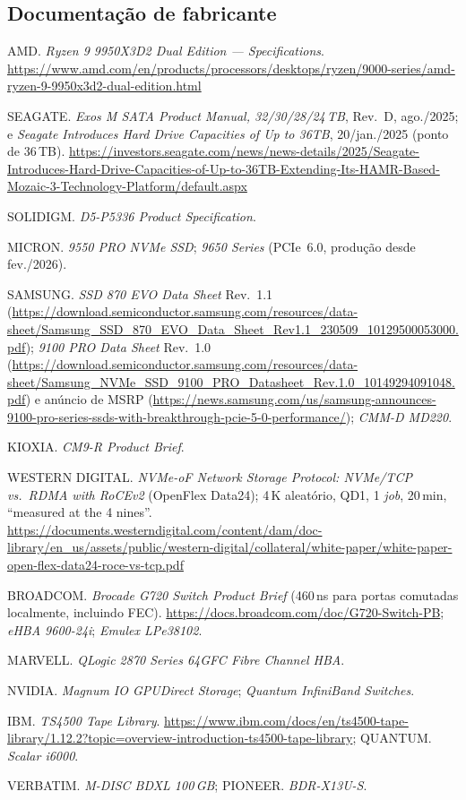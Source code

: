 \documentclass[11pt,a4paper]{article}
\begin{document}
\subsection*{Documentação de fabricante}
\begin{enumerate}[label={[\arabic*]},leftmargin=*,start=17]
\item AMD. \emph{Ryzen 9 9950X3D2 Dual Edition --- Specifications}.
      \url{https://www.amd.com/en/products/processors/desktops/ryzen/9000-series/amd-ryzen-9-9950x3d2-dual-edition.html}
\item SEAGATE. \emph{Exos M SATA Product Manual, 32/30/28/24\,TB}, Rev.~D, ago./2025; e
      \emph{Seagate Introduces Hard Drive Capacities of Up to 36TB}, 20/jan./2025 (ponto de 36\,TB).
      \url{https://investors.seagate.com/news/news-details/2025/Seagate-Introduces-Hard-Drive-Capacities-of-Up-to-36TB-Extending-Its-HAMR-Based-Mozaic-3-Technology-Platform/default.aspx}
\item SOLIDIGM. \emph{D5-P5336 Product Specification}.
\item MICRON. \emph{9550 PRO NVMe SSD}; \emph{9650 Series} (PCIe~6.0, produção desde fev./2026).
\item SAMSUNG. \emph{SSD 870 EVO Data Sheet} Rev.~1.1
      (\url{https://download.semiconductor.samsung.com/resources/data-sheet/Samsung_SSD_870_EVO_Data_Sheet_Rev1.1_230509_10129500053000.pdf});
      \emph{9100 PRO Data Sheet} Rev.~1.0
      (\url{https://download.semiconductor.samsung.com/resources/data-sheet/Samsung_NVMe_SSD_9100_PRO_Datasheet_Rev.1.0_10149294091048.pdf})
      e anúncio de MSRP
      (\url{https://news.samsung.com/us/samsung-announces-9100-pro-series-ssds-with-breakthrough-pcie-5-0-performance/});
      \emph{CMM-D MD220}.
\item KIOXIA. \emph{CM9-R Product Brief}.
\item WESTERN DIGITAL. \emph{NVMe-oF Network Storage Protocol: NVMe/TCP vs.\ RDMA with RoCEv2}
      (OpenFlex Data24); 4\,K aleatório, QD1, 1 \emph{job}, 20\,min, ``measured at the 4 nines''.
      \url{https://documents.westerndigital.com/content/dam/doc-library/en_us/assets/public/western-digital/collateral/white-paper/white-paper-open-flex-data24-roce-vs-tcp.pdf}
\item BROADCOM. \emph{Brocade G720 Switch Product Brief} (460\,ns para portas comutadas
      localmente, incluindo FEC). \url{https://docs.broadcom.com/doc/G720-Switch-PB};
      \emph{eHBA 9600-24i}; \emph{Emulex LPe38102}.
\item MARVELL. \emph{QLogic 2870 Series 64GFC Fibre Channel HBA}.
\item NVIDIA. \emph{Magnum IO GPUDirect Storage}; \emph{Quantum InfiniBand Switches}.
\item IBM. \emph{TS4500 Tape Library}.
      \url{https://www.ibm.com/docs/en/ts4500-tape-library/1.12.2?topic=overview-introduction-ts4500-tape-library};
      QUANTUM. \emph{Scalar i6000}.
\item VERBATIM. \emph{M-DISC BDXL 100\,GB}; PIONEER. \emph{BDR-X13U-S}.
\end{enumerate}
\end{document}
